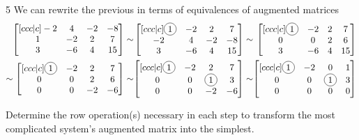 \begin{activity}{5}
We can rewrite the previous in terms of  equivalences of augmented matrices
\[
	\begin{alignedat}{3}
		\begin{bmatrix}[ccc|c] -2 & 4 & -2 & -8 \\ 1 & -2 & 2 & 7 \\ 3 & -6 & 4 & 15 \end{bmatrix} & \sim &
		\begin{bmatrix}[ccc|c] \circledNumber{1} & -2 & 2 & 7 \\ -2 & 4 & -2 & -8 \\ 3 & -6 & 4 & 15 \end{bmatrix} &\sim&
		\begin{bmatrix}[ccc|c] \circledNumber{1} & -2 & 2 & 7 \\ 0 & 0 & 2 & 6 \\ 3 & - 6 & 4 & 15 \end{bmatrix} \\
 \sim
		\begin{bmatrix}[ccc|c] \circledNumber{1} & -2 & 2 & 7 \\ 0 & 0 & 2 & 6 \\ 0 & 0 & -2 & -6 \end{bmatrix}  &\sim&
		\begin{bmatrix}[ccc|c] \circledNumber{1} & -2 & 2 & 7 \\ 0 & 0 & \circledNumber{1} & 3 \\ 0 & 0 & -2 & -6 \end{bmatrix}  &\sim&
		\begin{bmatrix}[ccc|c] \circledNumber{1} & -2 & 0 & 1 \\ 0 & 0 & \circledNumber{1} & 3 \\ 0 & 0 & 0 & 0 \end{bmatrix}
 	\end{alignedat}
\]

		Determine the row operation(s) necessary in each step to transform the most complicated
    system's augmented matrix into the simplest.

\end{activity}

